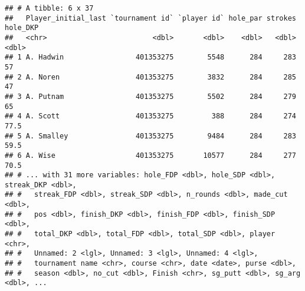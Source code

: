\documentclass[
]{article}
\newenvironment{Shaded}{\begin{snugshade}}{\end{snugshade}}
\newcommand{\CommentTok}[1]{\textcolor[rgb]{0.56,0.35,0.01}{\textit{#1}}}
\newcommand{\DataTypeTok}[1]{\textcolor[rgb]{0.13,0.29,0.53}{#1}}
\newcommand{\DecValTok}[1]{\textcolor[rgb]{0.00,0.00,0.81}{#1}}
\newcommand{\KeywordTok}[1]{\textcolor[rgb]{0.13,0.29,0.53}{\textbf{#1}}}
\newcommand{\NormalTok}[1]{#1}
\newcommand{\OperatorTok}[1]{\textcolor[rgb]{0.81,0.36,0.00}{\textbf{#1}}}
\newcommand{\OtherTok}[1]{\textcolor[rgb]{0.56,0.35,0.01}{#1}}
\newcommand{\StringTok}[1]{\textcolor[rgb]{0.31,0.60,0.02}{#1}}
\begin{document}
\begin{verbatim}
## # A tibble: 6 x 37
##   Player_initial_last `tournament id` `player id` hole_par strokes hole_DKP
##   <chr>                         <dbl>       <dbl>    <dbl>   <dbl>    <dbl>
## 1 A. Hadwin                 401353275        5548      284     283     57  
## 2 A. Noren                  401353275        3832      284     285     47  
## 3 A. Putnam                 401353275        5502      284     279     65  
## 4 A. Scott                  401353275         388      284     274     77.5
## 5 A. Smalley                401353275        9484      284     283     59.5
## 6 A. Wise                   401353275       10577      284     277     70.5
## # ... with 31 more variables: hole_FDP <dbl>, hole_SDP <dbl>, streak_DKP <dbl>,
## #   streak_FDP <dbl>, streak_SDP <dbl>, n_rounds <dbl>, made_cut <dbl>,
## #   pos <dbl>, finish_DKP <dbl>, finish_FDP <dbl>, finish_SDP <dbl>,
## #   total_DKP <dbl>, total_FDP <dbl>, total_SDP <dbl>, player <chr>,
## #   Unnamed: 2 <lgl>, Unnamed: 3 <lgl>, Unnamed: 4 <lgl>,
## #   tournament name <chr>, course <chr>, date <date>, purse <dbl>,
## #   season <dbl>, no_cut <dbl>, Finish <chr>, sg_putt <dbl>, sg_arg <dbl>, ...
\end{verbatim}

\begin{Shaded}
\end{Shaded}
\end{document}
